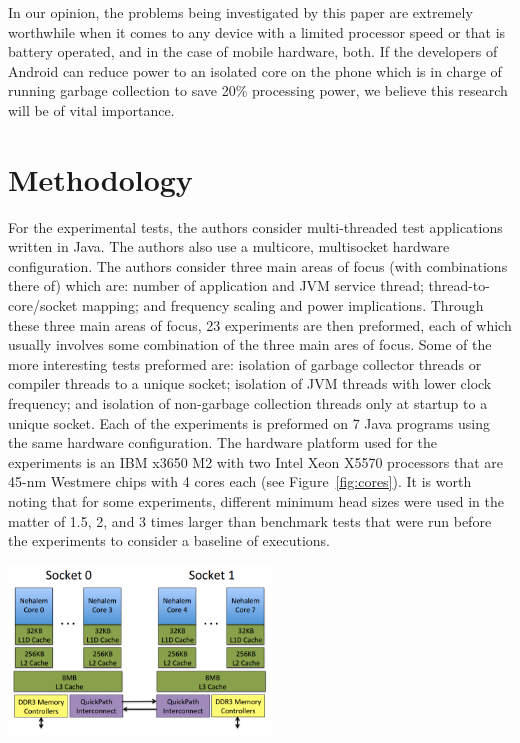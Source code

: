 \documentclass[conference]{IEEEtran}
\begin{document}
In our opinion, the problems being investigated by this paper are extremely worthwhile when
it comes to any device with a limited processor speed or that is battery operated, and in the
case of mobile hardware, both. If the developers of Android can reduce power to an isolated
core on the phone which is in charge of running garbage collection to save 20\% processing
power, we believe this research will be of vital importance.

\section{Methodology}

For the experimental tests, the authors consider multi-threaded test applications written in
Java. The authors also use a multicore, multisocket hardware configuration. The authors 
consider three main areas of focus (with combinations there of) which are: number of application
and JVM service thread; thread-to-core/socket mapping; and frequency scaling and power implications.
Through these three main areas of focus, 23 experiments are then preformed, each of which usually
involves some combination of the three main ares of focus. Some of the more interesting tests preformed 
are: isolation of garbage collector threads or compiler threads to a unique socket; isolation of
JVM threads with lower clock frequency; and isolation of non-garbage collection threads only 
at startup to a unique socket. Each of the experiments is preformed on 7 Java programs using
the same hardware configuration. The hardware platform used for the experiments is an IBM
x3650 M2 with two Intel Xeon X5570 processors that are 45-nm Westmere chips with 4 cores each
(see Figure~\ref{fig:cores}). It is worth noting that for some experiments, different minimum
head sizes were used in the matter of 1.5, 2, and 3 times larger than benchmark tests that were
run before the experiments to consider a baseline of executions.

\begin{center}
\includegraphics[height=45mm]{images/hardware}
\end{center}
\end{document}
